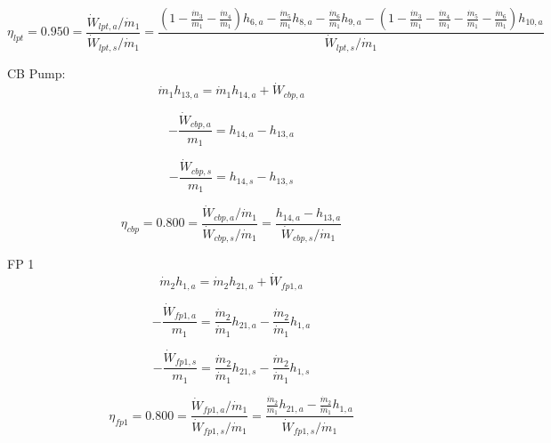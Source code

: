 \documentclass{article}
\begin{document}
\begin{equation}
\eta_{lpt} =    0.950 = \frac{\dot{W}_{lpt,a} / \dot{m}_{1}}{\dot{W}_{lpt,s} / \dot{m}_{1}} = \frac{
(1 - \frac{\dot{m}_{ 3}}{\dot{m}_{ 1}} - \frac{\dot{m}_{ 4}}{\dot{m}_{ 1}})h_{ 6,a} - \frac{\dot{m}_{ 5}}{\dot{m}_{ 1}}h_{ 8,a} - \frac{\dot{m}_{ 6}}{\dot{m}_{ 1}}h_{ 9,a} - (1 - \frac{\dot{m}_{ 3}}{\dot{m}_{ 1}} - \frac{\dot{m}_{ 4}}{\dot{m}_{ 1}} - \frac{\dot{m}_{ 5}}{\dot{m}_{ 1}} - \frac{\dot{m}_{ 6}}{\dot{m}_{ 1}})h_{10,a}}{\dot{W}_{lpt,s} / \dot{m}_{1}}
\end{equation}


CB Pump:
\begin{equation}
\dot{m}_{ 1}h_{13,a} = \dot{m}_{ 1}h_{14,a} + \dot{W}_{cbp,a}
\end{equation}

\begin{equation}
-\frac{\dot{W}_{cbp,a}}{m_1} = h_{14,a} - h_{13,a}\end{equation}

\begin{equation}
-\frac{\dot{W}_{cbp,s}}{m_1} = h_{14,s} - h_{13,s}\end{equation}

\begin{equation}
\eta_{cbp} =    0.800 = \frac{\dot{W}_{cbp,a} / \dot{m}_{1}}{\dot{W}_{cbp,s} / \dot{m}_{1}} = \frac{
h_{14,a} - h_{13,a}}{\dot{W}_{cbp,s} / \dot{m}_{1}}
\end{equation}


FP 1
\begin{equation}
\dot{m}_{ 2}h_{ 1,a} = \dot{m}_{ 2}h_{21,a} + \dot{W}_{fp1,a}
\end{equation}

\begin{equation}
-\frac{\dot{W}_{fp1,a}}{m_1} = \frac{\dot{m}_{ 2}}{\dot{m}_{ 1}}h_{21,a} - \frac{\dot{m}_{ 2}}{\dot{m}_{ 1}}h_{ 1,a}\end{equation}

\begin{equation}
-\frac{\dot{W}_{fp1,s}}{m_1} = \frac{\dot{m}_{ 2}}{\dot{m}_{ 1}}h_{21,s} - \frac{\dot{m}_{ 2}}{\dot{m}_{ 1}}h_{ 1,s}\end{equation}

\begin{equation}
\eta_{fp1} =    0.800 = \frac{\dot{W}_{fp1,a} / \dot{m}_{1}}{\dot{W}_{fp1,s} / \dot{m}_{1}} = \frac{
\frac{\dot{m}_{ 2}}{\dot{m}_{ 1}}h_{21,a} - \frac{\dot{m}_{ 2}}{\dot{m}_{ 1}}h_{ 1,a}}{\dot{W}_{fp1,s} / \dot{m}_{1}}
\end{equation}
\end{document}

